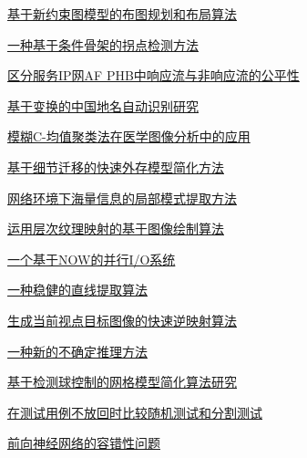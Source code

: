 \documentclass[a4paper]{article}
\begin{document}
\href{http://www.jos.org.cn/ch/reader/download_pdf.aspx?file_no=20011102&year_id=2001&quarter_id=11&falg=1}{基于新约束图模型的布图规划和布局算法}

\href{http://www.jos.org.cn/ch/reader/download_pdf.aspx?file_no=20011103&year_id=2001&quarter_id=11&falg=1}{一种基于条件骨架的拐点检测方法}

\href{http://www.jos.org.cn/ch/reader/download_pdf.aspx?file_no=20011104&year_id=2001&quarter_id=11&falg=1}{区分服务IP网AF PHB中响应流与非响应流的公平性}

\href{http://www.jos.org.cn/ch/reader/download_pdf.aspx?file_no=20011105&year_id=2001&quarter_id=11&falg=1}{基于变换的中国地名自动识别研究}

\href{http://www.jos.org.cn/ch/reader/download_pdf.aspx?file_no=20011107&year_id=2001&quarter_id=11&falg=1}{模糊C-均值聚类法在医学图像分析中的应用}

\href{http://www.jos.org.cn/ch/reader/download_pdf.aspx?file_no=20011108&year_id=2001&quarter_id=11&falg=1}{基于细节迁移的快速外存模型简化方法}

\href{http://www.jos.org.cn/ch/reader/download_pdf.aspx?file_no=20011109&year_id=2001&quarter_id=11&falg=1}{网络环境下海量信息的局部模式提取方法}

\href{http://www.jos.org.cn/ch/reader/download_pdf.aspx?file_no=20011110&year_id=2001&quarter_id=11&falg=1}{运用层次纹理映射的基于图像绘制算法}

\href{http://www.jos.org.cn/ch/reader/download_pdf.aspx?file_no=20011111&year_id=2001&quarter_id=11&falg=1}{一个基于NOW的并行I/O系统}

\href{http://www.jos.org.cn/ch/reader/download_pdf.aspx?file_no=20011112&year_id=2001&quarter_id=11&falg=1}{一种稳健的直线提取算法}

\href{http://www.jos.org.cn/ch/reader/download_pdf.aspx?file_no=20011113&year_id=2001&quarter_id=11&falg=1}{生成当前视点目标图像的快速逆映射算法}

\href{http://www.jos.org.cn/ch/reader/download_pdf.aspx?file_no=20011114&year_id=2001&quarter_id=11&falg=1}{一种新的不确定推理方法}

\href{http://www.jos.org.cn/ch/reader/download_pdf.aspx?file_no=20011115&year_id=2001&quarter_id=11&falg=1}{基于检测球控制的网格模型简化算法研究}

\href{http://www.jos.org.cn/ch/reader/download_pdf.aspx?file_no=20011116&year_id=2001&quarter_id=11&falg=1}{在测试用例不放回时比较随机测试和分割测试}

\href{http://www.jos.org.cn/ch/reader/download_pdf.aspx?file_no=20011117&year_id=2001&quarter_id=11&falg=1}{前向神经网络的容错性问题}
\end{document}
